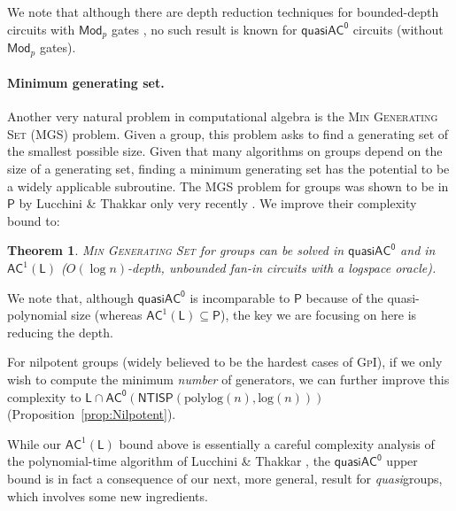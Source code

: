 \documentclass{article}
\newtheorem{theorem}{Theorem}\newtheorem{lemma}[theorem]{Lemma}\newtheorem{proposition}[theorem]{Proposition}\newtheorem{corollary}[theorem]{Corollary}\newtheorem{definition}[theorem]{Definition}\newtheorem{claim}[theorem]{Claim}\newtheorem{remark}[theorem]{Remark}\newtheorem{observation}[theorem]{Observation}\newtheorem{conjecture}[theorem]{Conjecture}\newtheorem{example}[theorem]{Example}
\newcommand{\algprobm}[1]{\textsc{#1}\xspace}
\newcommand*{\ComplexityClass}[1]{\ensuremath{\mathsf{#1}}\xspace}
\renewcommand{\P}{\ComplexityClass{P}}
\newcommand{\NTISP}{\ComplexityClass{NTISP}}
\newcommand{\NTISPpll}{\ensuremath{\NTISP(\mathrm{polylog}(n),\mathrm{log}(n))}\xspace}
\newcommand*{\LogSpace}{\ComplexityClass{L}}
\newcommand{\AC}{\ComplexityClass{AC}}
\newcommand{\ACz}{\ComplexityClass{AC^0}}
\newcommand{\qACz}{\ComplexityClass{quasiAC^0}}
\begin{document}
\begin{table}[!htbp]
\caption{\label{table:history} History of the low-level circuit complexity of algorithms for \algprobm{(Quasi)Group Isomorphism} based on the generator-enumerator technique. For non-circuit classes, we list their depth as the best-known depth of their simulation by circuits. The class in our bound is contained in all the other classes listed in the table. Although depth 4 in our result does not follow from the complexity class as listed here, it follows from the more exact class we use in Theorem~\ref{thm:QuasigroupIsoPolylogtime}. }
\end{table}

We note that although there are depth reduction techniques for bounded-depth circuits with $\mathsf{Mod}_p$ gates  \cite{AllenderH94}, no such result is known for $\qACz$ circuits (without $\mathsf{Mod}_p$ gates).

\paragraph{Minimum generating set.} Another very natural problem in computational algebra is the \algprobm{Min Generating Set} (\algprobm{MGS}) problem. Given a group, this problem asks to find a generating set of the smallest possible size. Given that many algorithms on groups depend on the size of a generating set, finding a minimum generating set has the potential to be a widely applicable subroutine. The \algprobm{MGS} problem for groups was shown to be in $\P$ by Lucchini \& Thakkar only very recently \cite{LucchiniThakkar}. We improve their complexity bound to:

\begin{theorem}
\algprobm{Min Generating Set} for groups can be solved in $\qACz$ and in $\mathsf{AC}^1(\LogSpace)$ ($O(\log n)$-depth, unbounded fan-in circuits with a logspace oracle).
\end{theorem}

\noindent We note that, although $\qACz$ is incomparable to $\P$ because of the quasi-polynomial size (whereas $\AC^1(\LogSpace) \subseteq \P$), the key we are focusing on here is reducing the depth. 

For nilpotent groups (widely believed to be the hardest cases of \algprobm{GpI}), if we only wish to compute the minimum \emph{number} of generators, we can further improve this complexity to $\LogSpace \cap \ACz(\NTISPpll)$ (Proposition~\ref{prop:Nilpotent}).

While our $\AC^1(\LogSpace)$ bound above is essentially a careful complexity analysis of the polynomial-time algorithm of Lucchini \& Thakkar \cite{LucchiniThakkar}, the $\qACz$ upper bound is in fact a consequence of our next, more general, result for \emph{quasi}groups, which involves some new ingredients.
\end{document}
